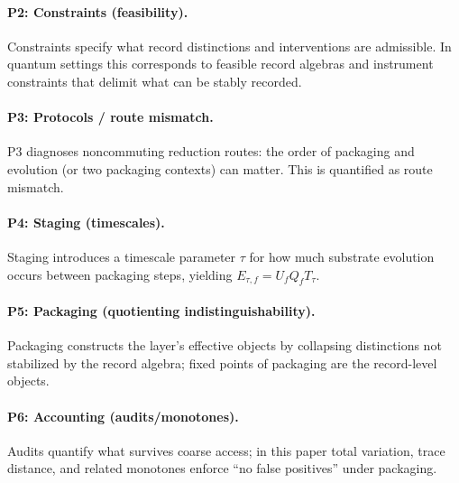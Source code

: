 \documentclass[11pt]{article}
\begin{document}
\paragraph{P2: Constraints (feasibility).}
Constraints specify what record distinctions and interventions are admissible. In quantum settings this corresponds to feasible record algebras and instrument constraints that delimit what can be stably recorded.

\paragraph{P3: Protocols / route mismatch.}
P3 diagnoses noncommuting reduction routes: the order of packaging and evolution (or two packaging contexts) can matter. This is quantified as route mismatch.

\paragraph{P4: Staging (timescales).}
Staging introduces a timescale parameter $\tau$ for how much substrate evolution occurs between packaging steps, yielding $E_{\tau,f}=U_f Q_f T_\tau$.

\paragraph{P5: Packaging (quotienting indistinguishability).}
Packaging constructs the layer’s effective objects by collapsing distinctions not stabilized by the record algebra; fixed points of packaging are the record-level objects.

\paragraph{P6: Accounting (audits/monotones).}
Audits quantify what survives coarse access; in this paper total variation, trace distance, and related monotones enforce ``no false positives'' under packaging.
\end{document}
